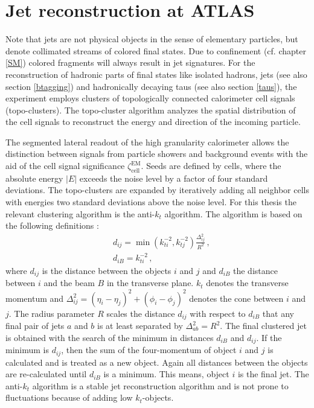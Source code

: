 \section{Jet reconstruction at ATLAS}\label{jets}
Note that jets are not physical objects in the sense of elementary particles, but denote collimated streams of colored final states. Due to confinement (cf. chapter \ref{SM}) colored fragments will always result in jet signatures. \cite{PhysTeV}\newline  
For the reconstruction of hadronic parts of final states like isolated hadrons, jets (see also section \ref{btagging}) and hadronically decaying taus (see also section \ref{taus}), the {\ATLAS} experiment employs clusters of topologically connected calorimeter cell signals (topo-clusters). The topo-cluster algorithm analyzes the spatial distribution of the cell signals to reconstruct the energy and direction of the incoming particle. \cite{topo}\par
The segmented lateral readout of the high granularity calorimeter allows the distinction between signals from particle showers and background events with the aid of the cell signal significance $\zeta_\text{cell}^\text{EM}$. \cite{topo} Seeds are defined by cells, where the absolute energy $|E|$ exceeds the noise level by a factor of four standard deviations. The topo-clusters are expanded by iteratively adding all neighbor cells with energies two standard deviations above the noise level. \cite{jetPerformance}\newline
For this thesis the relevant clustering algorithm is the anti-$k_t$ algorithm. The algorithm is based on the following definitions \cite{antikt}:
\begin{align}
                        &d_{ij}=\min(k_{ti}^{-2},k_{tj}^{-2})\frac{\Delta_{ij}^2}{R^2}\,\text{,}\\
                        &d_{iB}=k_{ti}^{-2}\,\text{,}
\label{antiktalgorithm}
\end{align}
where $d_{ij}$ is the distance between the objects $i$ and $j$ and $d_{iB}$ the distance between $i$ and the beam $B$ in the transverse plane. $k_t$ denotes the transverse momentum and $\Delta_{ij}^2=(\eta_i-\eta_j)^2+(\phi_i-\phi_j)^2$ denotes the cone between $i$ and $j$. The radius parameter $R$ scales the distance $d_{ij}$ with respect to $d_{iB}$ that any final pair of jets $a$ and $b$ is at least separated by $\Delta^2_{ab}=R^2$. The final clustered jet is obtained with the search of the minimum in distances $d_{iB}$ and $d_{ij}$. If the minimum is $d_{ij}$, then the sum of the four-momentum of object $i$ and $j$ is calculated and is treated as a new object. Again all distances between the objects are re-calculated until $d_{iB}$ is a minimum. This means, object $i$ is the final jet. The anti-$k_t$ algorithm is a stable jet reconstruction algorithm and is not prone to fluctuations because of adding low $k_t$-objects. \cite{antikt}
%
%
